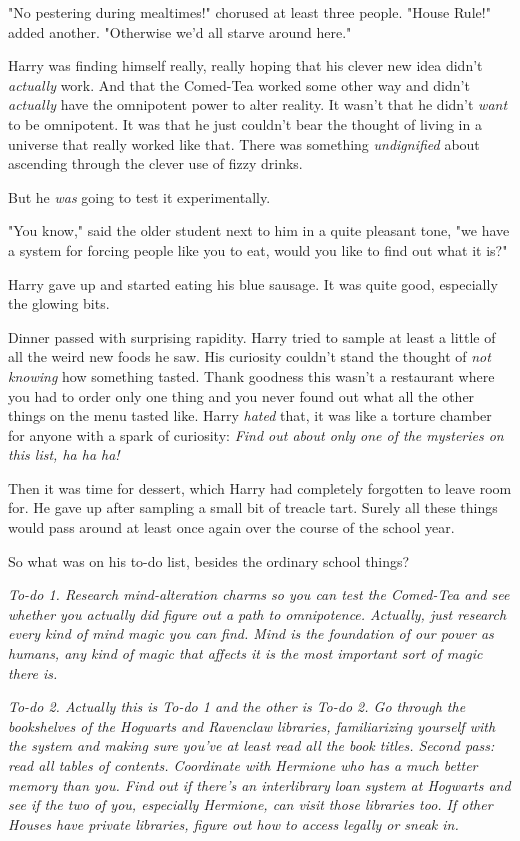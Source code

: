 "No pestering during mealtimes!" chorused at least three people. "House Rule!"
added another. "Otherwise we'd all starve around here."

Harry was finding himself really, really hoping that his clever new idea didn't
\emph{actually} work. And that the Comed-Tea worked some other way and didn't
\emph{actually} have the omnipotent power to alter reality. It wasn't that he
didn't \emph{want} to be omnipotent. It was that he just couldn't bear the
thought of living in a universe that really worked like that. There was
something \emph{undignified} about ascending through the clever use of fizzy
drinks.

But he \emph{was} going to test it experimentally.

"You know," said the older student next to him in a quite pleasant tone, "we
have a system for forcing people like you to eat, would you like to find out
what it is?"

Harry gave up and started eating his blue sausage. It was quite good,
especially the glowing bits.

Dinner passed with surprising rapidity. Harry tried to sample at least a little
of all the weird new foods he saw. His curiosity couldn't stand the thought of
\emph{not knowing} how something tasted. Thank goodness this wasn't a
restaurant where you had to order only one thing and you never found out what
all the other things on the menu tasted like. Harry \emph{hated} that, it was
like a torture chamber for anyone with a spark of curiosity: \emph{Find out
about only one of the mysteries on this list, ha ha ha!}

Then it was time for dessert, which Harry had completely forgotten to leave
room for. He gave up after sampling a small bit of treacle tart. Surely all
these things would pass around at least once again over the course of the
school year.

So what was on his to-do list, besides the ordinary school things?

\emph{To-do 1. Research mind-alteration charms so you can test the Comed-Tea
and see whether you actually did figure out a path to omnipotence. Actually,
just research every kind of mind magic you can find. Mind is the foundation of
our power as humans, any kind of magic that affects it is the most important
sort of magic there is.}

\emph{To-do 2. Actually this is To-do 1 and the other is To-do 2. Go through
the bookshelves of the Hogwarts and Ravenclaw libraries, familiarizing yourself
with the system and making sure you've at least read all the book titles.
Second pass: read all tables of contents. Coordinate with Hermione who has a
much better memory than you. Find out if there's an interlibrary loan system at
Hogwarts and see if the two of you, especially Hermione, can visit those
libraries too. If other Houses have private libraries, figure out how to access
legally or sneak in.}

